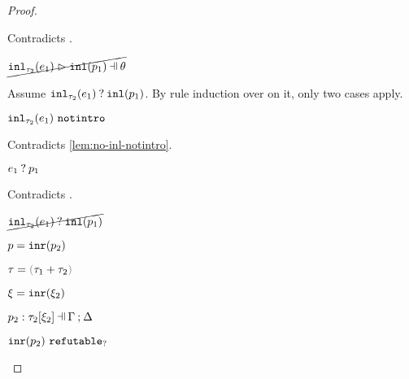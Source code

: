 \begin{proof}
\begin{byCases}
\begin{byCases}
\begin{byCases}
\begin{byCases}
                Contradicts .
            \end{byCases}
            \begin{pfsteps*}
            \item $\cancel{\hpatmatch{\hinl{\tau_2}{e_1}}{\hinlp{p_1}}{\theta}}$ 
            \end{pfsteps*}
            Assume $\mathtt{inl}_{\tau_2}({e_1}) \mathbin{?} \mathtt{inl}(p_1)$. By rule induction over  on it, only two cases apply.
            \begin{byCases}
            \item[\text{(\ref{rule:MMNotIntro})}]
                \begin{pfsteps*}
                \item $\mathtt{inl}_{\tau_2}({e_1}) ~\mathtt{notintro}$ 
                \end{pfsteps*}
                Contradicts \autoref{lem:no-inl-notintro}.
            \item[\text{(\ref{rule:MMInl})}]
                \begin{pfsteps*}
                \item $e_1 \mathbin{?} p_1$ 
                \end{pfsteps*}
                Contradicts .
            \end{byCases}
            \begin{pfsteps*}
            \item $\cancel{\mathtt{inl}_{\tau_2}({e_1}) \mathbin{?} \mathtt{inl}(p_1)}$ 
            \end{pfsteps*}
        \end{byCases}
    \end{byCases}
\item[\text{(\ref{rule:PTInr})}]
    \begin{pfsteps*}
    \item $p=\mathtt{inr}(p_2)$ 
    \item $\tau=\tsum{\tau_1}{\tau_2}$ 
    \item $\xi=\mathtt{inr}(\xi_2)$ 
    \item $\chpattyp{p_2}{\tau_2}{\xi_2}{\Gamma}{\Delta}$  
    \item $\mathtt{inr}(p_2) ~\mathtt{refutable}_?$  
    \end{pfsteps*}

\end{byCases}
\end{proof}
